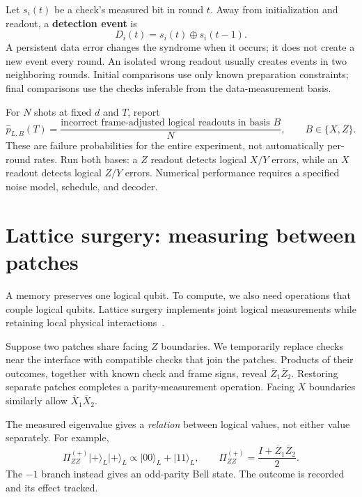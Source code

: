 \documentclass[11pt,a4paper]{article}
\newcommand{\ket}[1]{\lvert #1\rangle}
\newcommand{\XL}{\overline{X}}
\newcommand{\ZL}{\overline{Z}}
\begin{document}
Let $s_i(t)$ be a check's measured bit in round $t$. Away from initialization and readout, a \textbf{detection event} is
\[
D_i(t)=s_i(t)\oplus s_i(t-1).
\]
A persistent data error changes the syndrome when it occurs; it does not create a new event every round. An isolated wrong readout usually creates events in two neighboring rounds. Initial comparisons use only known preparation constraints; final comparisons use the checks inferable from the data-measurement basis.

For $N$ shots at fixed $d$ and $T$, report
\[
\widehat p_{L,B}(T)=\frac{\text{incorrect frame-adjusted logical readouts in basis }B}{N},
\qquad B\in\{X,Z\}.
\]
These are failure probabilities for the entire experiment, not automatically per-round rates. Run both bases: a $Z$ readout detects logical $X/Y$ errors, while an $X$ readout detects logical $Z/Y$ errors. Numerical performance requires a specified noise model, schedule, and decoder.

\newpage
\section{Lattice surgery: measuring between patches}

A memory preserves one logical qubit. To compute, we also need operations that couple logical qubits. Lattice surgery implements joint logical measurements while retaining local physical interactions~\cite{horsman}.

Suppose two patches share facing $Z$ boundaries. We temporarily replace checks near the interface with compatible checks that join the patches. Products of their outcomes, together with known check and frame signs, reveal $\ZL_1\ZL_2$. Restoring separate patches completes a parity-measurement operation. Facing $X$ boundaries similarly allow $\XL_1\XL_2$.

The measured eigenvalue gives a \emph{relation} between logical values, not either value separately. For example,
\[
\Pi_{ZZ}^{(+)}\ket{+}_L\ket{+}_L
\propto \ket{00}_L+\ket{11}_L,
\qquad
\Pi_{ZZ}^{(+)}=\frac{I+\ZL_1\ZL_2}{2}.
\]
The $-1$ branch instead gives an odd-parity Bell state. The outcome is recorded and its effect tracked.

\begin{center}
\surgerydiagram
{}
\end{center}
\end{document}
